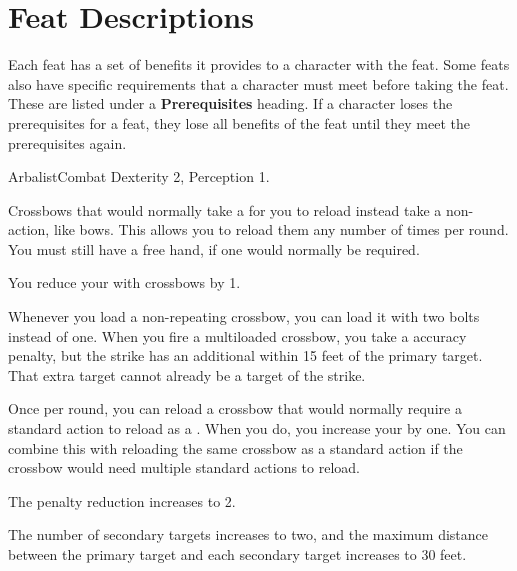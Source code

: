 \section{Feat Descriptions}
  Each feat has a set of benefits it provides to a character with the feat.
  Some feats also have specific requirements that a character must meet before taking the feat.
  These are listed under a \textbf{Prerequisites} heading.
  If a character loses the prerequisites for a feat, they lose all benefits of the feat until they meet the prerequisites again.

  \begin{feat}{Arbalist}{Combat}
    \featpre Dexterity 2, Perception 1.

     Crossbows that would normally take a  for you to reload instead take a non-action, like bows.
    This allows you to reload them any number of times per round.
    You must still have a free hand, if one would normally be required.

     You reduce your  with crossbows by 1.

     Whenever you load a non-repeating crossbow, you can load it with two bolts instead of one.
    When you fire a multiloaded crossbow, you take a  accuracy penalty, but the strike has an additional  within 15 feet of the primary target.
    That extra target cannot already be a target of the strike.

     Once per round, you can reload a crossbow that would normally require a standard action to reload as a .
    When you do, you increase your  by one.
    You can combine this with reloading the same crossbow as a standard action if the crossbow would need multiple standard actions to reload.

     The penalty reduction increases to 2.

     The number of secondary targets increases to two, and the maximum distance between the primary target and each secondary target increases to 30 feet.
  \end{feat}

